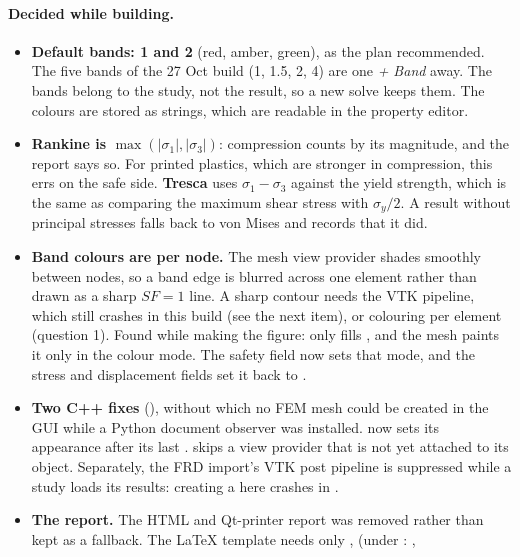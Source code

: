 \paragraph{Decided while building.}
\begin{itemize}[nosep]
  \item \textbf{Default bands: 1 and 2} (red, amber, green), as the plan recommended. The five bands of the
        27 Oct build (1, 1.5, 2, 4) are one \emph{+ Band} away. The bands belong to the study, not the result,
        so a new solve keeps them. The colours are stored as  strings, which are readable in
        the property editor.
  \item \textbf{Rankine is $\max(|\sigma_1|,|\sigma_3|)$}: compression counts by its magnitude, and the report
        says so. For printed plastics, which are stronger in compression, this errs on the safe side.
        \textbf{Tresca} uses $\sigma_1-\sigma_3$ against the yield strength, which is the same as comparing the
        maximum shear stress with $\sigma_y/2$. A result without principal stresses falls back to von Mises
        and records that it did.
  \item \textbf{Band colours are per node.} The mesh view provider shades smoothly between nodes, so a band
        edge is blurred across one element rather than drawn as a sharp $SF=1$ line. A sharp contour needs the
        VTK pipeline, which still crashes in this build (see the next item), or colouring per element (question
        1). Found while making the figure:  only fills , and the mesh paints
        it only in the  colour mode. The safety field now sets that mode, and the stress and
        displacement fields set it back to .
  \item \textbf{Two C++ fixes} (), without which no FEM mesh could be created in the GUI while a
        Python document observer was installed.  now sets its appearance after its last
        .  skips a view provider that is not
        yet attached to its object. Separately, the FRD import's VTK post pipeline is suppressed while a study
        loads its results: creating a  here crashes in
        .
  \item \textbf{The report.} The HTML and Qt-printer report was removed rather than kept as a fallback. The
        LaTeX template needs only ,  (under : ,

\end{itemize}
